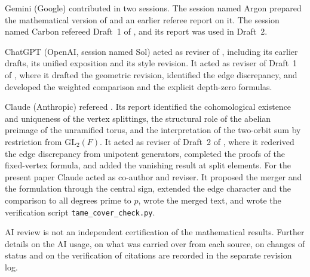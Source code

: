\documentclass[12pt,letterpaper]{article}
\numberwithin{equation}{section}
\theoremstyle{definition}
\theoremstyle{remark}
\begin{document}
Gemini (Google) contributed in two sessions. The session named Argon prepared the mathematical version of \cite{Jo26a} and an earlier referee report on it. The session named Carbon refereed Draft~1 of \cite{Jo26b}, and its report was used in Draft~2.

ChatGPT (OpenAI, session named Sol) acted as reviser of \cite{Jo26a}, including its earlier drafts, its unified exposition and its style revision. It acted as reviser of Draft~1 of \cite{Jo26b}, where it drafted the geometric revision, identified the edge discrepancy, and developed the weighted comparison and the explicit depth-zero formulas.

Claude (Anthropic) refereed \cite{Jo26a}. Its report identified the cohomological existence and uniqueness of the vertex splittings, the structural role of the abelian preimage of the unramified torus, and the interpretation of the two-orbit sum by restriction from $\mathrm{GL}_2(F)$. It acted as reviser of Draft~2 of \cite{Jo26b}, where it rederived the edge discrepancy from unipotent generators, completed the proofs of the fixed-vertex formula, and added the vanishing result at split elements. For the present paper Claude acted as co-author and reviser. It proposed the merger and the formulation through the central sign, extended the edge character and the comparison to all degrees prime to $p$, wrote the merged text, and wrote the verification script \texttt{tame\_cover\_check.py}.

AI review is not an independent certification of the mathematical results. Further details on the AI usage, on what was carried over from each source, on changes of status and on the verification of citations are recorded in the separate revision log.
\end{document}
